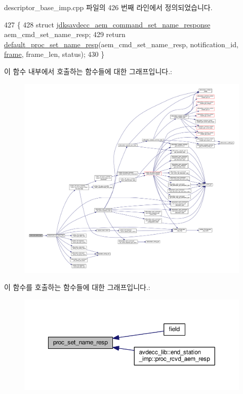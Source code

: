 descriptor\+\_\+base\+\_\+imp.\+cpp 파일의 426 번째 라인에서 정의되었습니다.


\begin{DoxyCode}
427 \{
428     \textcolor{keyword}{struct }\hyperlink{structjdksavdecc__aem__command__set__name__response}{jdksavdecc\_aem\_command\_set\_name\_response} 
      aem\_cmd\_set\_name\_resp;
429     \textcolor{keywordflow}{return} \hyperlink{classavdecc__lib_1_1descriptor__base__imp_a2f52c3b9a7ad6f490bed0c96a9136bc3}{default\_proc\_set\_name\_resp}(aem\_cmd\_set\_name\_resp, notification\_id, 
      \hyperlink{gst__avb__playbin_8c_ac8e710e0b5e994c0545d75d69868c6f0}{frame}, frame\_len, status);
430 \}
\end{DoxyCode}


이 함수 내부에서 호출하는 함수들에 대한 그래프입니다.\+:
\nopagebreak
\begin{figure}[H]
\begin{center}
\leavevmode
\includegraphics[width=350pt]{classavdecc__lib_1_1descriptor__base__imp_a182c43d9f31980bb74f05956b1323624_cgraph}
\end{center}
\end{figure}




이 함수를 호출하는 함수들에 대한 그래프입니다.\+:
\nopagebreak
\begin{figure}[H]
\begin{center}
\leavevmode
\includegraphics[width=350pt]{classavdecc__lib_1_1descriptor__base__imp_a182c43d9f31980bb74f05956b1323624_icgraph}
\end{center}
\end{figure}


